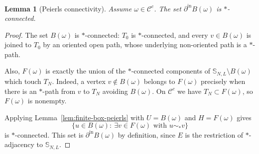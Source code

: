 \documentclass[11pt]{amsart}
\newtheorem{lemma}[theorem]{Lemma}
\theoremstyle{definition}
\numberwithin{equation}{section}
\newcommand{\Sbb}{\mathbb{S}}
\newcommand{\mrm}[1]{\mathrm{#1}}
\newcommand{\1}{\mathbbm{1}}
\begin{document}
\begin{lemma}[Peierls connectivity]\label{lem:peierls-connectivity}
Assume $\omega\in\mathcal C^c$. The set $\partial^{\mrm{in}} B(\omega)$ is
$*$-connected.
\end{lemma}

\begin{proof}
The set $B(\omega)$ is $*$-connected: $T_0$ is $*$-connected, and every
$v\in B(\omega)$ is joined to $T_0$ by an oriented open path, whose underlying
non-oriented path is a $*$-path.

Also, $F(\omega)$ is exactly the union of the $*$-connected components of
$\Sbb_{N,L}\setminus B(\omega)$ which touch $T_N$. Indeed, a
vertex $v\notin B(\omega)$ belongs to $F(\omega)$ precisely when there is an
$*$-path from $v$ to $T_N$ avoiding $B(\omega)$. On
$\mathcal C^c$ we have $T_N\subset F(\omega)$, so $F(\omega)$ is nonempty.

Applying Lemma~\ref{lem:finite-box-peierls} with $U=B(\omega)$ and
$H=F(\omega)$ gives
\[
\{u\in B(\omega):\ \exists v\in F(\omega)\text{ with }u\sim_* v\}
\]
is $*$-connected. This set is $\partial^{\mrm{in}} B(\omega)$ by definition,
since $E$ is the restriction of $*$-adjacency to $\Sbb_{N,L}$.
\end{proof}
\end{document}
